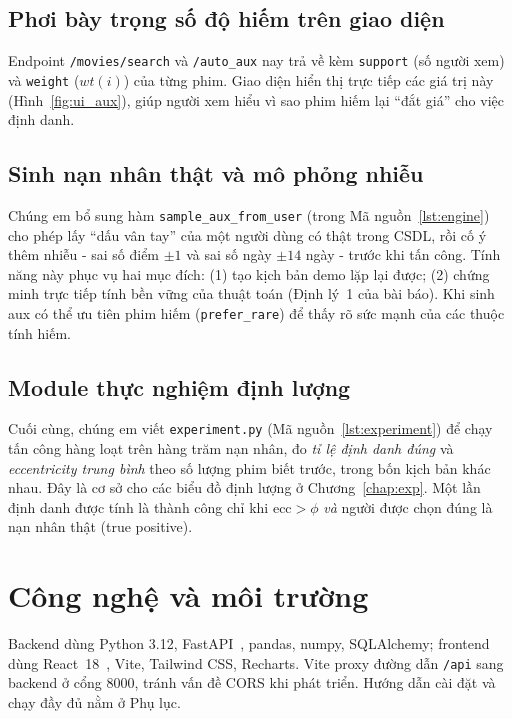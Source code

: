 \subsection{Phơi bày trọng số độ hiếm trên giao diện}
Endpoint \texttt{/movies/search} và \texttt{/auto\_aux} nay trả về kèm \texttt{support} (số người xem) và \texttt{weight} ($wt(i)$) của từng phim. Giao diện hiển thị trực tiếp các giá trị này (Hình~\ref{fig:ui_aux}), giúp người xem hiểu vì sao phim hiếm lại ``đắt giá'' cho việc định danh.

\subsection{Sinh nạn nhân thật và mô phỏng nhiễu}
Chúng em bổ sung hàm \texttt{sample\_aux\_from\_user} (trong Mã nguồn~\ref{lst:engine}) cho phép lấy ``dấu vân tay'' của một người dùng có thật trong CSDL, rồi cố ý thêm nhiễu - sai số điểm $\pm 1$ và sai số ngày $\pm 14$ ngày - trước khi tấn công. Tính năng này phục vụ hai mục đích: (1) tạo kịch bản demo lặp lại được; (2) chứng minh trực tiếp tính bền vững của thuật toán (Định lý~1 của bài báo). Khi sinh aux có thể ưu tiên phim hiếm (\texttt{prefer\_rare}) để thấy rõ sức mạnh của các thuộc tính hiếm.

\subsection{Module thực nghiệm định lượng}
Cuối cùng, chúng em viết \texttt{experiment.py} (Mã nguồn~\ref{lst:experiment}) để chạy tấn công hàng loạt trên hàng trăm nạn nhân, đo \textit{tỉ lệ định danh đúng} và \textit{eccentricity trung bình} theo số lượng phim biết trước, trong bốn kịch bản khác nhau. Đây là cơ sở cho các biểu đồ định lượng ở Chương~\ref{chap:exp}. Một lần định danh được tính là thành công chỉ khi $\mathrm{ecc} > \phi$ \textit{và} người được chọn đúng là nạn nhân thật (true positive).

\section{Công nghệ và môi trường}

Backend dùng Python 3.12, FastAPI~\cite{fastapi}, pandas, numpy, SQLAlchemy; frontend dùng React~18~\cite{react}, Vite, Tailwind CSS, Recharts. Vite proxy đường dẫn \texttt{/api} sang backend ở cổng 8000, tránh vấn đề CORS khi phát triển. Hướng dẫn cài đặt và chạy đầy đủ nằm ở Phụ lục.
